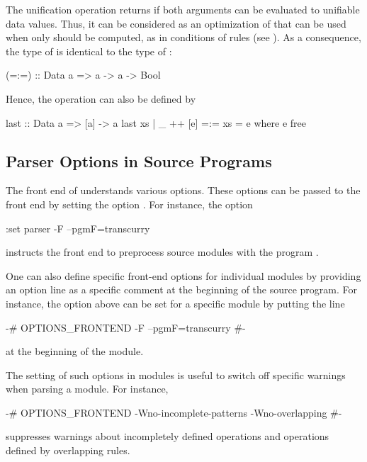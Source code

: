 The unification operation \ccode{=:=} returns 
if both arguments can be evaluated to unifiable data values.
Thus, it can be considered as an optimization of \ccode{===}
that can be used when only  should be computed,
as in conditions of rules (see \cite{AntoyHanus17FAoC}).
As a consequence, the type of \ccode{=:=} is identical
to the type of \ccode{===}:
%
\begin{curry}
(=:=) :: Data a => a -> a -> Bool
\end{curry}
%
Hence, the operation  can also be defined by
%
\begin{curry}
last :: Data a => [a] -> a
last xs | _ ++ [e] =:= xs = e
  where e free
\end{curry}
%

\subsection{Parser Options in Source Programs}

The front end of \CYS understands various options.
These options can be passed to the front end by setting
the \CYS option .
For instance, the option
%
\begin{curry}
:set parser -F --pgmF=transcurry
\end{curry}
%
instructs the front end to preprocess source modules with
the program .

One can also define specific front-end options
for individual modules by providing an option line as a specific
comment at the beginning of the source program.
For instance, the option above can be set for a specific module
by putting the line
%
\begin{curry}
{-# OPTIONS_FRONTEND -F --pgmF=transcurry #-}
\end{curry}
%
at the beginning of the module.

The setting of such options in modules
is useful to switch off specific warnings when parsing a module.
For instance, 
%
\begin{curry}
{-# OPTIONS_FRONTEND -Wno-incomplete-patterns -Wno-overlapping #-}
\end{curry}
%
suppresses warnings about incompletely defined operations
and operations defined by overlapping rules.

